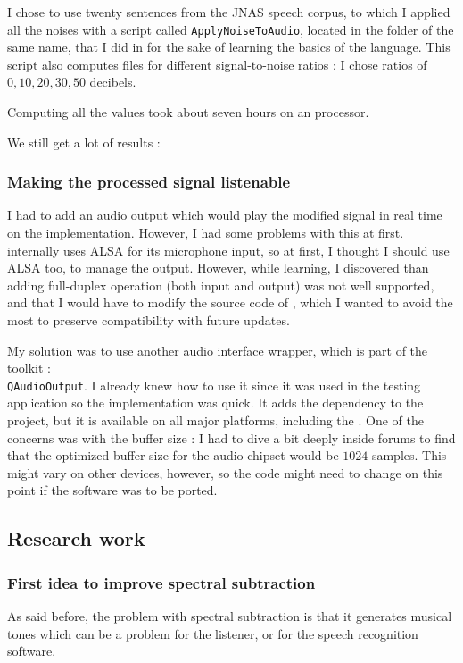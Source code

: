 I chose to use twenty sentences from the \ac{JNAS} speech corpus, to which I applied all the noises with a script called \texttt{ApplyNoiseToAudio}, located in the folder of the same name, that I did in  for the sake of learning the basics of the language.
This script also computes files for different signal-to-noise ratios : I chose ratios of $0, 10, 20, 30, 50$ decibels.

Computing all the values took about seven hours on an  processor.

We still get a lot of results :  
\subsubsection{Making the processed signal listenable}
I had to add an audio output which would play the modified signal in real time on the  implementation. However, I had some problems with this at first.  internally uses \ac{ALSA} for its microphone input, so at first, I thought I should use \ac{ALSA} too, to manage the output. However, while learning, I discovered than adding full-duplex operation (both input and output) was not well supported, and that I would have to modify the source code of , which I wanted to avoid the most to preserve compatibility with future updates.

My solution was to use another audio interface wrapper, which is part of the  toolkit :\\ \texttt{QAudioOutput}. I already knew how to use it since it was used in the testing application so the implementation was quick. It adds the  dependency to the project, but it is available on all major platforms, including the . One of the concerns was with the buffer size : I had to dive a bit deeply inside  forums to find that the optimized buffer size for the audio chipset would be $1024$ samples. This might vary on other devices, however, so the code might need to change on this point if the software was to be ported.
\subsection{Research work}
\subsubsection{First idea to improve spectral subtraction}
As said before, the problem with spectral subtraction is that it generates musical tones which can be a problem for the listener, or for the speech recognition software.

